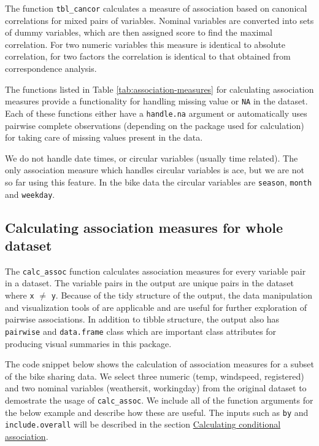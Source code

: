 The function \texttt{tbl\_cancor} calculates a measure of association
based on canonical correlations for mixed pairs of variables. Nominal
variables are converted into sets of dummy variables, which are then
assigned score to find the maximal correlation. For two numeric
variables this measure is identical to absolute correlation, for two
factors the correlation is identical to that obtained from
correspondence analysis.

The functions listed in Table \ref{tab:association-measures} for
calculating association measures provide a functionality for handling
missing value or \texttt{NA} in the dataset. Each of these functions
either have a \texttt{handle.na} argument or automatically uses pairwise
complete observations (depending on the package used for calculation)
for taking care of missing values present in the data.

We do not handle date times, or circular variables (usually time
related). The only association measure which handles circular variables
is ace, but we are not so far using this feature. In the bike data the
circular variables are \texttt{season}, \texttt{month} and
\texttt{weekday}.

\hypertarget{calculating-association-measures-for-whole-dataset}{%
\subsection{Calculating association measures for whole
dataset}\label{calculating-association-measures-for-whole-dataset}}

The \texttt{calc\_assoc} function calculates association measures for
every variable pair in a dataset. The variable pairs in the output are
unique pairs in the dataset where \texttt{x} \(\neq\) \texttt{y}.
Because of the tidy structure of the output, the data manipulation and
visualization tools of  \citep{tidyverse} are
applicable and are useful for further exploration of pairwise
associations. In addition to tibble structure, the output also has
\texttt{pairwise} and \texttt{data.frame} class which are important
class attributes for producing visual summaries in this package.

The code snippet below shows the calculation of association measures for
a subset of the bike sharing data. We select three numeric (temp,
windspeed, registered) and two nominal variables (weathersit,
workingday) from the original dataset to demostrate the usage of
\texttt{calc\_assoc}. We include all of the function arguments for the
below example and describe how these are useful. The inputs such as
\texttt{by} and \texttt{include.overall} will be described in the
section
\protect\hyperlink{calculating-conditional-association}{Calculating
conditional association}.

